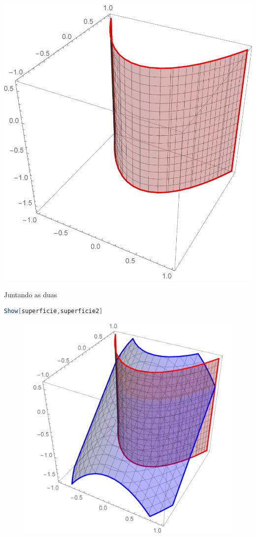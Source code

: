 \documentclass[a4paper, 12pt]{article}
\begin{document}
\begin{minipage}{.5\linewidth}
	\includegraphics[scale=.25]{images/ContourRed}
\end{minipage}

Juntando as duas

\begin{lstlisting}[language=Mathematica]
Show[superficie,superficie2]
\end{lstlisting}

\begin{figure}[!h]
	\centering
	\includegraphics[scale=.44]{images/Juntos}
\end{figure}
\end{document}

